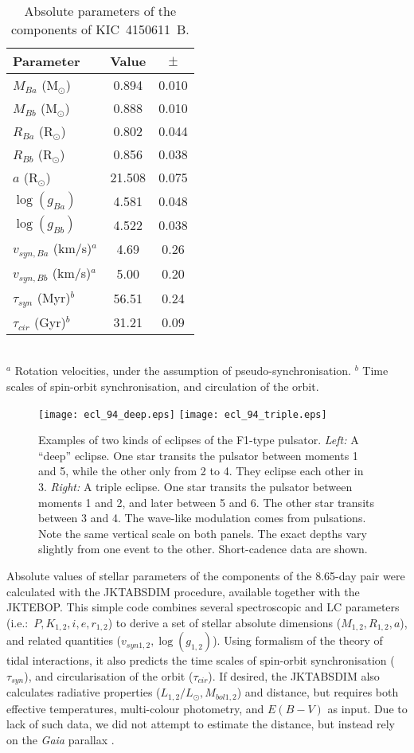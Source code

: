 \documentclass{aa}
\begin{document}
\begin{table}
\centering
\caption{Absolute parameters of the components of KIC~4150611~B.}\label{tab_par}
\begin{tabular}{lcc}
\hline \hline
Parameter & Value & $\pm$ \\
\hline
$M_{Ba}$ (M$_\odot$)	& 0.894	& 0.010	\\
$M_{Bb}$ (M$_\odot$)	& 0.888	& 0.010	\\
$R_{Ba}$ (R$_\odot$)	& 0.802	& 0.044	\\
$R_{Bb}$ (R$_\odot$)	& 0.856	& 0.038	\\
$a$ (R$_\odot$)	&21.508	& 0.075	\\
$\log(g_{Ba})$		& 4.581	& 0.048	\\
$\log(g_{Bb})$		& 4.522	& 0.038	\\
$v_{syn,Ba}$ (km/s)$^a$	& 4.69	& 0.26	\\
$v_{syn,Bb}$ (km/s)$^a$	& 5.00	& 0.20	\\
$\tau_{syn}$ (Myr)$^b$	& 56.51	& 0.24	\\
$\tau_{cir}$ (Gyr)$^b$	& 31.21	& 0.09	\\
\hline
\end{tabular}
\\$^a$ Rotation velocities, under the assumption of pseudo-synchronisation.
$^b$ Time scales of spin-orbit synchronisation, and circulation of the orbit.
\end{table}

\begin{figure*}
\centering
\texttt{[image: ecl\_94\_deep.eps]}
\texttt{[image: ecl\_94\_triple.eps]}
\caption{Examples of two kinds of eclipses of the F1-type pulsator.
{\it Left:} A ``deep'' eclipse. One star transits the pulsator between
moments 1 and 5, while the other only from 2 to 4. They eclipse each
other in 3.
{\it Right:} A triple eclipse. One star transits the pulsator 
between moments 1 and 2, and later between 5 and 6. The other 
star transits between 3 and 4.
The wave-like modulation comes from pulsations. Note the same 
vertical scale on both panels. The exact depths vary slightly from
one event to the other. Short-cadence data are shown.
}\label{fig_ecl_94}
\end{figure*}

Absolute values of stellar parameters of the components of the 8.65-day pair were 
calculated with the JKTABSDIM procedure, available together with the JKTEBOP. 
This simple code combines several spectroscopic and LC parameters 
(i.e.:~$P,K_{1,2},i,e,r_{1,2}$) to derive a set of stellar absolute dimensions 
($M_{1,2},R_{1,2},a$), and related quantities ($v_{syn1,2},\log(g_{1,2})$).
Using formalism of the theory of tidal interactions, it also predicts the time
scales of spin-orbit synchronisation ($\tau_{syn}$), and circularisation of
the orbit ($\tau_{cir}$). If desired, the JKTABSDIM also calculates radiative 
properties ($L_{1,2}/L_\odot,M_{bol1,2}$) and distance, but requires both effective 
temperatures, multi-colour photometry, and $E(B-V)$ as input. Due to lack of such 
data, we did not attempt to estimate the distance, but instead rely on the {\it Gaia} 
parallax \citep{gai16}. 
\end{document}
